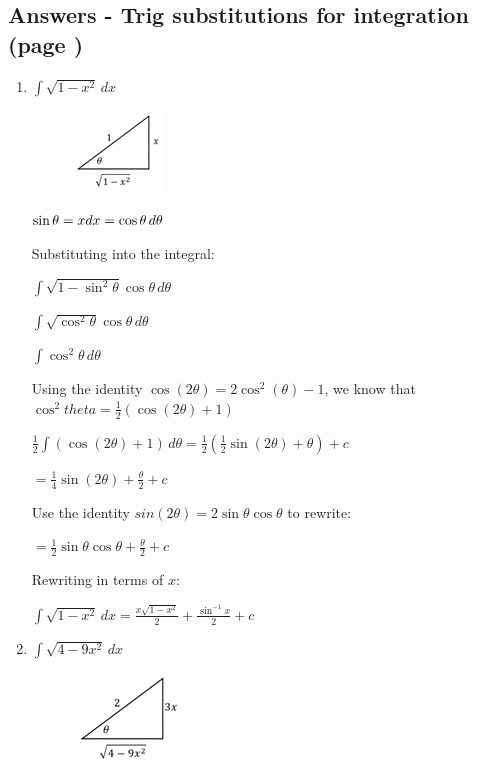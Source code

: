 \documentclass[../main.tex]{subfiles}
\begin{document}
\subsection*{Answers - Trig substitutions for integration (page \pageref{Trig substitution})}
\label{Trig subs answers}
\begin{enumerate}
    \item 
    \(\int \sqrt{1-x^2}\,dx\)
    \begin{figure}[h]
        \includegraphics{images/trigsuba1.png}
    \end{figure}

    \(\sin{\theta}=x\\
    dx=\cos{\theta}\, d\theta\)
    
    Substituting into the integral:

    \(\int \sqrt{1-\sin^2{\theta}}\cos{\theta}\,d\theta\)

    \(\int \sqrt{\cos^2{\theta}}\cos{\theta}\,d\theta\)

    \(\int \cos^2{\theta} \,d\theta\)

    Using the identity \(\cos{(2\theta)}=2\cos^2{(\theta)}-1\), we know that \(\cos^2{theta}=\frac{1}{2}(\cos{(2\theta)}+1)\)

    \(\frac{1}{2}\int (\cos{(2\theta)}+1)\,d\theta=\frac{1}{2}(\frac{1}{2}\sin{(2\theta)}+\theta)+c\)

    \(=\frac{1}{4}\sin{(2\theta)}+\frac{\theta}{2}+c\)

    Use the identity \(sin{(2\theta)}=2\sin{\theta}\cos{\theta}\) to rewrite:

    \(=\frac{1}{2}\sin{\theta}\cos{\theta}+\frac{\theta}{2}+c\)

    Rewriting in terms of \(x\):

    \(\int \sqrt{1-x^2}\,dx=\frac{x\sqrt{1-x^2}}{2}+\frac{\sin^{-1}{x}}{2}+c\)

    \item 
    \(\int \sqrt{4-9x^2}\,dx\)
    \begin{figure}[h]
        \includegraphics{images/trigsuba2.png}
    \end{figure}


\end{enumerate}
\end{document}
